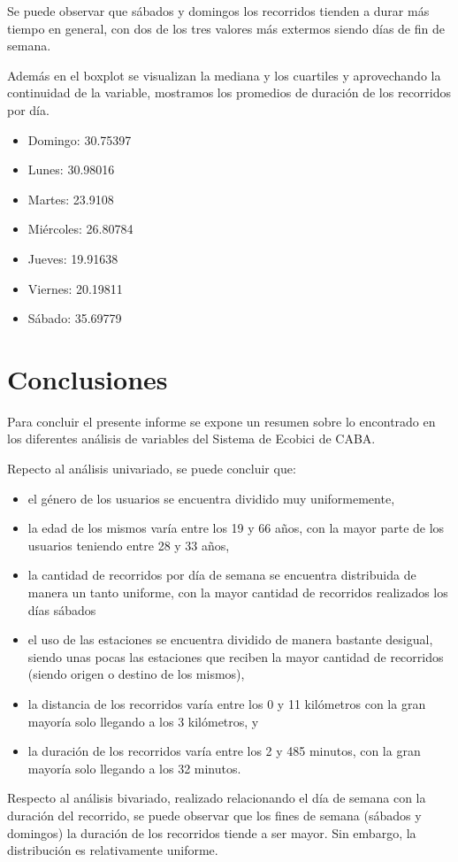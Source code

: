 \documentclass[11pt]{article}
\begin{document}
    Se puede observar que s\'abados y domingos los recorridos tienden a durar m\'as tiempo en general, con dos de los tres valores m\'as extermos siendo d\'ias de fin de semana. %

    Adem\'as en el boxplot se visualizan la mediana y los cuartiles y aprovechando la continuidad de la variable, mostramos los promedios de duraci\'on de los recorridos por d\'ia.

    \begin{itemize}
      \item Domingo: 30.75397
      \item Lunes: 30.98016
      \item Martes: 23.9108
      \item Mi\'ercoles: 26.80784
      \item Jueves: 19.91638
      \item Viernes: 20.19811
      \item S\'abado: 35.69779
    \end{itemize}

    \section{Conclusiones}
    Para concluir el presente informe se expone un resumen sobre lo encontrado en los diferentes an\'alisis de variables del Sistema de Ecobici de CABA.

    Repecto al an\'alisis univariado, se puede concluir que: 
    \begin{itemize}
      \item el g\'enero de los usuarios se encuentra dividido muy uniformemente, 
      \item la edad de los mismos var\'ia entre los 19 y 66 años, con la mayor parte de los usuarios teniendo entre 28 y 33 años,
      \item la cantidad de recorridos por d\'ia de semana se encuentra distribuida de manera un tanto uniforme, con la mayor cantidad de recorridos realizados los d\'ias s\'abados
      \item el uso de las estaciones se encuentra dividido de manera bastante desigual, siendo unas pocas las estaciones que reciben la mayor cantidad de recorridos (siendo origen o destino de los mismos),
      \item la distancia de los recorridos var\'ia entre los 0 y 11 kilómetros con la gran mayor\'ia solo llegando a los 3 kil\'ometros, y
      \item la duraci\'on de los recorridos var\'ia entre los 2 y 485 minutos, con la gran mayor\'ia solo llegando a los 32 minutos.
    \end{itemize}
      
    Respecto al an\'alisis bivariado, realizado relacionando el d\'ia de semana con la duraci\'on del recorrido, se puede observar que los fines de semana (s\'abados y domingos) la duraci\'on de los recorridos tiende a ser mayor. Sin embargo, la distribuci\'on es relativamente uniforme.
\end{document}
